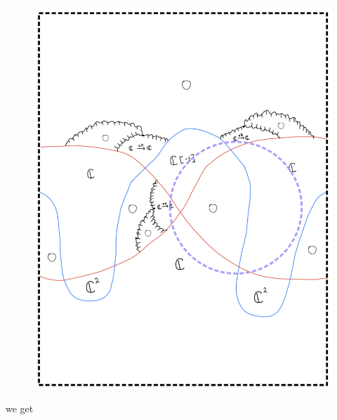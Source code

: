 \begin{enumerate}[label=(Step \arabic*)]
\begin{figure}[H]
    \centering
    \includegraphics[scale = 0.85]{diagrams/cobord8/4.png}
    \caption{}
    \label{fig:your-label}
\end{figure}
\pagebreak
we get


\end{enumerate}
